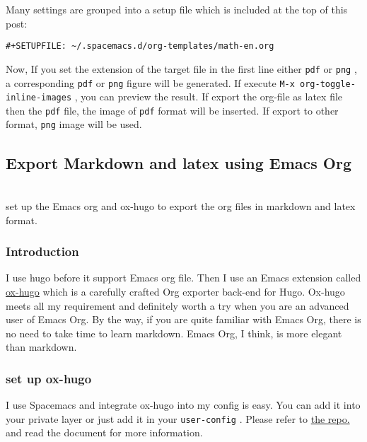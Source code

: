 \documentclass[koma,utopia,a4paper,captions=tableheading,11pt,listings-sv,microtype,paralist,colorlinks=true,urlcolor=blue]{org-article}
\begin{document}
Many settings are grouped into a setup file which is included at the top of this
post:
\begin{verbatim}
#+SETUPFILE: ~/.spacemacs.d/org-templates/math-en.org
\end{verbatim}

Now, If you set the extension of the target file in the first line either \texttt{pdf} or
\texttt{png} , a corresponding \texttt{pdf} or \texttt{png} figure will be generated. If execute \texttt{M-x
org-toggle-inline-images}  , you can preview the result. If export the org-file
as latex file then the \texttt{pdf} file, the image of \texttt{pdf} format will be inserted. If
export to other format, \texttt{png} image will be used.



\subsection{Export Markdown and latex using Emacs Org}
\label{sec:orgd6fe22f}


\hspace{0pt}\\


set up the Emacs org and ox-hugo to export the org files in markdown and latex format.


\subsubsection{Introduction}
\label{sec:orgd478c4d}


I use hugo before it support Emacs org file. Then I use an Emacs extension
called \href{https://github.com/kaushalmodi/ox-hugo}{ox-hugo} which is a carefully crafted Org exporter back-end for Hugo.
Ox-hugo meets all my requirement and definitely worth a try when you are an
advanced user of Emacs Org. By the way, if you are quite familiar with Emacs
Org, there is no need to take time to learn markdown. Emacs Org, I think, is
more elegant than markdown.

\subsubsection{set up ox-hugo}
\label{sec:org76b6cf4}


I use Spacemacs and integrate ox-hugo into my config is easy. You can add it
into your private layer or just add it in your \texttt{user-config} . Please refer to
\href{https://github.com/kaushalmodi/ox-hugo}{the repo.} and read the document for more information.
\end{document}
